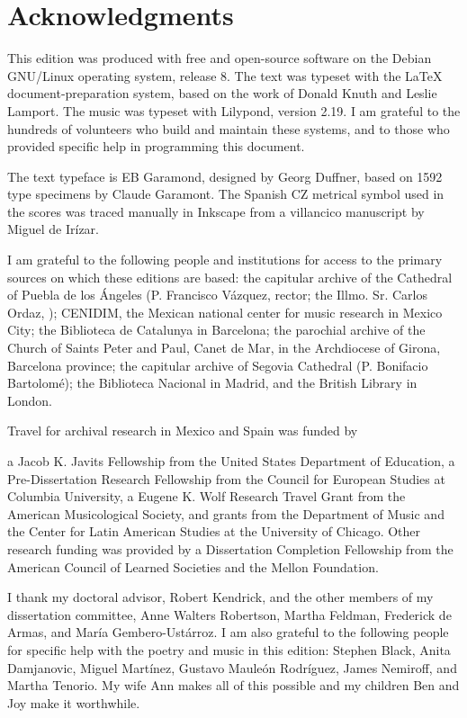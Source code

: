 \section{Acknowledgments}

This edition was produced with free and open-source software on the Debian 
GNU/Linux operating system, release 8.
The text was typeset with the \LaTeX{} document-preparation system, based on 
the work of Donald Knuth and Leslie Lamport.
The music was typeset with Lilypond, version 2.19.
I am grateful to the hundreds of volunteers who build and maintain these 
systems, and to those who provided specific help in programming this document.

The text typeface is EB Garamond, designed by Georg Duffner, based on 1592 type 
specimens by Claude Garamont.
The Spanish CZ metrical symbol used in the scores was traced manually in 
Inkscape from a villancico manuscript by Miguel de Irízar.

I am grateful to the following people and institutions for access to the 
primary sources on which these editions are based: 
the capitular archive of the Cathedral of Puebla de los Ángeles (P. Francisco 
Vázquez, rector; the Illmo. Sr. Carlos Ordaz, );
CENIDIM, the Mexican national center for music research in Mexico City;
the Biblioteca de Catalunya in Barcelona;
the parochial archive of the Church of Saints Peter and Paul, Canet de Mar, in 
the Archdiocese of Girona, Barcelona province;
the capitular archive of Segovia Cathedral (P. Bonifacio Bartolomé);
the Biblioteca Nacional in Madrid, and
the British Library in London.

Travel for archival research in Mexico and Spain was funded by 
\begin{anonymize}
    a Jacob K. Javits Fellowship from the United States Department of Education, 
    a Pre-Dissertation Research Fellowship from the Council for European Studies at 
    Columbia University, 
    a Eugene K. Wolf Research Travel Grant from the American Musicological Society, 
    and grants from the Department of Music and the Center for Latin American 
    Studies at the University of Chicago.
    Other research funding was provided by a Dissertation Completion Fellowship 
    from the American Council of Learned Societies and the Mellon Foundation.

    I thank my doctoral advisor, Robert Kendrick, and the other members of my 
    dissertation committee, Anne Walters Robertson, Martha Feldman, Frederick de 
    Armas, and María Gembero-Ustárroz.
    I am also grateful to the following people for specific help with the poetry 
    and music in this edition:
    Stephen Black,
    Anita Damjanovic, 
    Miguel Martínez, 
    Gustavo Mauleón Rodríguez,
    James Nemiroff, and
    Martha Tenorio.
    My wife Ann makes all of this possible and my children Ben and Joy make it
    worthwhile.
\end{anonymize}
